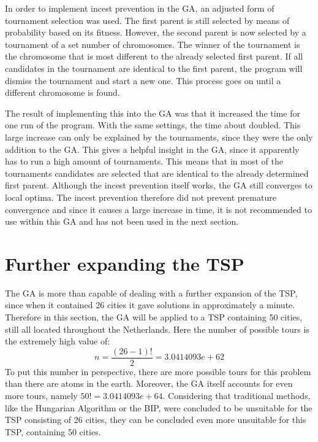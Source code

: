 \par
In order to implement incest prevention in the GA, an adjusted form of tournament selection was used. The first parent is still selected by means of probability based on its fitness. However, the second parent is now selected by a tournament of a set number of chromosomes. The winner of the tournament is the chromosome that is most different to the already selected first parent. If all candidates in the tournament are identical to the first parent, the program will dismiss the tournament and start a new one. This process goes on until a different chromosome is found. 

\par
The result of implementing this into the GA was that it increased the time for one run of the program. With the same settings, the time about doubled. This large increase can only be explained by the tournaments, since they were the only addition to the GA. This gives a helpful insight in the GA, since it apparently has to run a high amount of tournaments. This means that in most of the tournaments candidates are selected that are identical to the already determined first parent. Although the incest prevention itself works, the GA still converges to local optima. The incest prevention therefore did not prevent premature convergence and since it causes a large increase in time, it is not recommended to use within this GA and has not been used in the next section. 

\section{Further expanding the TSP}
\par
The GA is more than capable of dealing with a further expansion of the TSP, since when it contained 26 cities it gave solutions in approximately a minute. Therefore in this section, the GA will be applied to a TSP containing 50 cities, still all located throughout the Netherlands. Here the number of possible tours is the extremely high value of:
\[n = \frac{(26-1)!}{2} = 3.0414093e+62\]
To put this number in perspective, there are more possible tours for this problem than there are atoms in the earth. Moreover, the GA itself accounts for even more tours, namely $50! = 3.0414093e+64$. Considering that traditional methods, like the Hungarian Algorithm or the BIP, were concluded to be unsuitable for the TSP consisting of 26 cities, they can be concluded even more unsuitable for this TSP, containing 50 cities.

